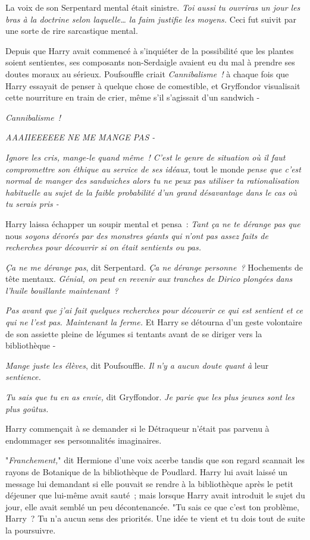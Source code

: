 La voix de son Serpentard mental était sinistre. \emph{Toi aussi tu ouvriras un jour les bras à la doctrine selon laquelle… la faim justifie les moyens.} Ceci fut suivit par une sorte de rire sarcastique mental.

Depuis que Harry avait commencé à s'inquiéter de la possibilité que les plantes soient sentientes, ses composants non-Serdaigle avaient eu du mal à prendre ses doutes moraux au sérieux. Poufsouffle criait \emph{Cannibalisme~!} à chaque fois que Harry essayait de penser à quelque chose de comestible, et Gryffondor visualisait cette nourriture en train de crier, même s'il s'agissait d'un sandwich -

\emph{Cannibalisme~!}

\emph{AAAIIEEEEEE NE ME MANGE PAS -}

\emph{Ignore les cris, mange-le quand même~! C'est le genre de situation où il faut compromettre son éthique au service de ses idéaux,} tout le monde \emph{pense que c'est normal de manger des sandwiches alors tu ne peux pas utiliser ta rationalisation habituelle au sujet de la faible probabilité d'un grand désavantage dans le cas où tu serais pris -}

Harry laissa échapper un soupir mental et pensa~: \emph{Tant ça ne te dérange pas que} nous \emph{soyons dévorés par des monstres géants qui n'ont pas assez faits de recherches pour découvrir si on était sentients ou pas.}

\emph{Ça ne me dérange pas}, dit Serpentard. \emph{Ça ne dérange personne~?} Hochements de tête mentaux. \emph{Génial, on peut en revenir aux tranches de Dirico plongées dans l'huile bouillante maintenant~?}

\emph{Pas avant que j'ai fait quelques recherches pour découvrir ce qui est sentient et ce qui ne l'est pas. Maintenant la ferme.} Et Harry se détourna d'un geste volontaire de son assiette pleine de légumes si tentants avant de se diriger vers la bibliothèque -

\emph{Mange juste les élèves}, dit Poufsouffle. \emph{Il n'y a aucun doute quant à} leur \emph{sentience.}

\emph{Tu sais que tu en as envie,} dit Gryffondor. \emph{Je parie que les plus jeunes sont les plus goûtus.}

Harry commençait à se demander si le Détraqueur n'était pas parvenu à endommager ses personnalités imaginaires.

\later

"\emph{Franchement,}" dit Hermione d'une voix acerbe tandis que son regard scannait les rayons de Botanique de la bibliothèque de Poudlard. Harry lui avait laissé un message lui demandant si elle pouvait se rendre à la bibliothèque après le petit déjeuner que lui-même avait sauté~; mais lorsque Harry avait introduit le sujet du jour, elle avait semblé un peu décontenancée. "Tu sais ce que c'est ton problème, Harry~? Tu n'a aucun sens des priorités. Une idée te vient et tu dois tout de suite la poursuivre.

